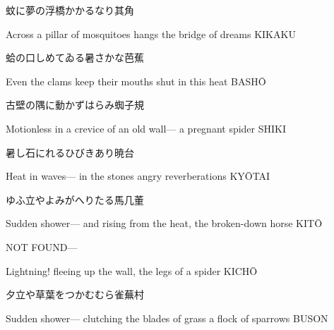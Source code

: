 \begin{haiku}
    {\FH 蚊に夢の浮橋かかるなり}\hfill{\FH 其角}

    \vin{} Across a pillar of mosquitoes
    \vin{} \vin{} hangs the bridge
    \vin{} \vin{} \vin{} of dreams \hspace{\fill} KIKAKU
\end{haiku}

\begin{haiku}
    {\FH 蛤の口しめてゐる暑さかな}\hfill{\FH 芭蕉}

    \vin{} Even the clams
    \vin{} \vin{} keep their mouths shut
    \vin{} \vin{} \vin{} in this heat \hspace{\fill} BASH\={O}
\end{haiku}

\begin{haiku}
    {\FH 古壁の隅に動かずはらみ蜘}\hfill{\FH 子規}

    \vin{} Motionless
    \vin{} \vin{} in a crevice of an old wall---
    \vin{} \vin{} \vin{} a pregnant spider \hspace{\fill} SHIKI
\end{haiku}

\begin{haiku}
    {\FH {}暑し石にれるひびきあり}\hfill{\FH 暁台}

    \vin{} Heat in waves---
    \vin{} \vin{} in the stones
    \vin{} \vin{} \vin{} angry reverberations \hspace{\fill} KY\={O}TAI
\end{haiku}

\begin{haiku}
    {\FH ゆふ立やよみがへりたる馬}\hfill{\FH 几董}

    \vin{} Sudden shower---
    \vin{} \vin{} and rising from the heat,
    \vin{} \vin{} \vin{} the broken-down horse \hspace{\fill} KIT\={O}
\end{haiku}

\begin{haiku}
   NOT FOUND\hfill{---}

    \vin{} Lightning!
    \vin{} \vin{} fleeing up the wall,
    \vin{} \vin{} \vin{} the legs of a spider \hspace{\fill} KICH\={O}
\end{haiku}

\begin{haiku}
    {\FH 夕立や草葉をつかむむら雀}\hfill{\FH 蕪村}

    \vin{} Sudden shower---
    \vin{} \vin{} clutching the blades of grass
    \vin{} \vin{} \vin{} a flock of sparrows \hspace{\fill} BUSON
\end{haiku}

